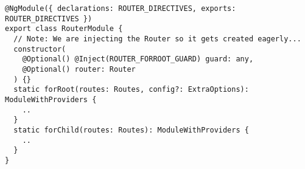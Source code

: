 \begin{verbatim}
@NgModule({ declarations: ROUTER_DIRECTIVES, exports: ROUTER_DIRECTIVES })
export class RouterModule {
  // Note: We are injecting the Router so it gets created eagerly...
  constructor(
    @Optional() @Inject(ROUTER_FORROOT_GUARD) guard: any,
    @Optional() router: Router
  ) {}
  static forRoot(routes: Routes, config?: ExtraOptions): ModuleWithProviders {
    ..
  }
  static forChild(routes: Routes): ModuleWithProviders {
    ..
  }
}
\end{verbatim}

